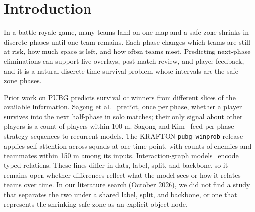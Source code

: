 \section{Introduction}\label{sec:intro}

In a battle royale game, many teams land on one map and a safe zone shrinks in discrete phases until one team remains. Each phase changes which teams are still at risk, how much space is left, and how often teams meet. Predicting next-phase eliminations can support live overlays, post-match review, and player feedback, and it is a natural discrete-time survival problem whose intervals are the safe-zone phases.

Prior work on PUBG predicts survival or winners from different slices of the available information. Sagong et al.~\cite{sagong2025hunterCamper} predict, once per phase, whether a player survives into the next half-phase in solo matches; their only signal about other players is a count of players within 100 m. Sagong and Kim~\cite{sagong2025survivalSequences} feed per-phase strategy sequences to recurrent models. The KRAFTON \texttt{pubg-winprob} release~\cite{krafton_pubg_winprob} applies self-attention across squads at one time point, with counts of enemies and teammates within 150 m among its inputs. Interaction-graph models~\cite{wang2025higformer,ying2021graphormer,xenopoulos2021gnnSports,bisberg2022gcnWp} encode typed relations. These lines differ in data, label, split, and backbone, so it remains open whether differences reflect what the model sees or how it relates teams over time. In our literature search (October 2026), we did not find a study that separates the two under a shared label, split, and backbone, or one that represents the shrinking safe zone as an explicit object node.

